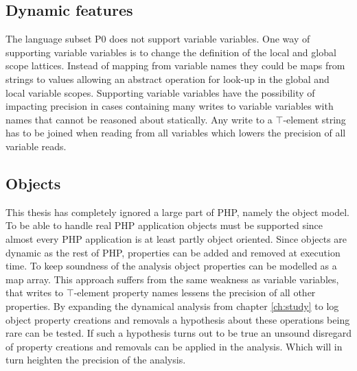 \subsection{Dynamic features}
The language subset P0 does not support variable variables. One way of supporting variable variables is to change the definition of the local and global scope lattices. Instead of mapping from variable names they could be maps from strings to values allowing an abstract operation for look-up in the global and local variable scopes. Supporting variable variables have the possibility of impacting precision in cases containing many writes to variable variables with names that cannot be reasoned about statically. Any write to a $\top$-element string has to be joined when reading from all variables which lowers the precision of all variable reads.




\subsection{Objects}
This thesis has completely ignored a large part of PHP, namely the object model. To be able to handle real PHP application objects must be supported since almost every PHP application is at least partly object oriented. Since objects are dynamic as the rest of PHP, properties can be added and removed at execution time. To keep soundness of the analysis object properties can be modelled as a map array. This approach suffers from the same weakness as variable variables, that writes to $\top$-element property names lessens the precision of all other properties. By expanding the dynamical analysis from chapter \ref{ch:study} to log object property creations and removals a hypothesis about these operations being rare can be tested. If such a hypothesis turns out to be true an unsound disregard of property creations and removals can be applied in the analysis. Which will in turn heighten the precision of the analysis.

